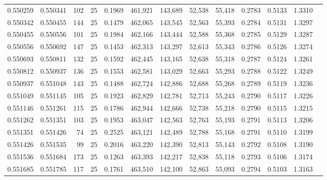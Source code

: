 \begin{tabular}{rrrrrrrrrrrrr}
0.550259 & 0.550341 &   102 &  25 &                                     0.1969 & 461,921 & 143,689 &  52,538 &  55,418 & 0.2783 & 0.5133 & 1.3310 \\
0.550342 & 0.550455 &   144 &  25 &                                     0.1479 & 462,065 & 143,545 &  52,563 &  55,393 & 0.2784 & 0.5131 & 1.3297 \\
0.550455 & 0.550556 &   101 &  25 &                                     0.1984 & 462,166 & 143,444 &  52,588 &  55,368 & 0.2785 & 0.5129 & 1.3287 \\
0.550556 & 0.550692 &   147 &  25 &                                     0.1453 & 462,313 & 143,297 &  52,613 &  55,343 & 0.2786 & 0.5126 & 1.3274 \\
0.550693 & 0.550811 &   132 &  25 &                                     0.1592 & 462,445 & 143,165 &  52,638 &  55,318 & 0.2787 & 0.5124 & 1.3261 \\
0.550812 & 0.550937 &   136 &  25 &                                     0.1553 & 462,581 & 143,029 &  52,663 &  55,293 & 0.2788 & 0.5122 & 1.3249 \\
0.550937 & 0.551048 &   143 &  25 &                                     0.1488 & 462,724 & 142,886 &  52,688 &  55,268 & 0.2789 & 0.5119 & 1.3236 \\
0.551049 & 0.551145 &   105 &  25 &                                     0.1923 & 462,829 & 142,781 &  52,713 &  55,243 & 0.2790 & 0.5117 & 1.3226 \\
0.551146 & 0.551261 &   115 &  25 &                                     0.1786 & 462,944 & 142,666 &  52,738 &  55,218 & 0.2790 & 0.5115 & 1.3215 \\
0.551262 & 0.551351 &   103 &  25 &                                     0.1953 & 463,047 & 142,563 &  52,763 &  55,193 & 0.2791 & 0.5113 & 1.3206 \\
0.551351 & 0.551426 &    74 &  25 &                                     0.2525 & 463,121 & 142,489 &  52,788 &  55,168 & 0.2791 & 0.5110 & 1.3199 \\
0.551426 & 0.551535 &    99 &  25 &                                     0.2016 & 463,220 & 142,390 &  52,813 &  55,143 & 0.2792 & 0.5108 & 1.3190 \\
0.551536 & 0.551684 &   173 &  25 &                                     0.1263 & 463,393 & 142,217 &  52,838 &  55,118 & 0.2793 & 0.5106 & 1.3174 \\
0.551685 & 0.551785 &   117 &  25 &                                     0.1761 & 463,510 & 142,100 &  52,863 &  55,093 & 0.2794 & 0.5103 & 1.3163 \\

\end{tabular}
